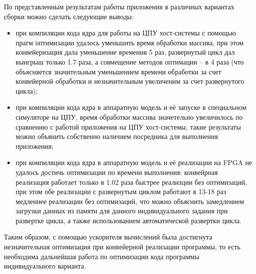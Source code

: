 По представленным результатам работы приложения в различных вариантах сборки
можно сделать следующие выводы:
\begin{itemize}
    \item при компиляции кода ядра для работы на ЦПУ хост-системы с помощью
          прагм оптимизации удалось уменьшить время обработки массива, при этом
          конвейеризация дала уменьшение временив 5 раз, развернутый цикл дал
          выигрыш только 1.7 раза, а совмещение методов оптимации -- в 4 раза
          (что объясняется значительным уменьшением времени обработки за счет
          конвейерной обработки и незначительным увеличеним за счет
          развернутого цикла);
    \item при компиляции кода ядра в аппаратную модель и её запуске в
          специальном симуляторе на ЦПУ, время обработки массива значетельно
          увеличилось по сравнению с работой приложения на ЦПУ хост-системы,
          такие результаты можно объянить собственно наличием посредника для
          выполнения приложения;
    \item при компиляции кода ядра в аппаратную модель и её реализации на FPGA
          не удалось достичь оптимизации по времени выполнения: конвейрная
          реализация работает только в 1.02 раза быстрее реализции без
          оптимизаций, при этом обе реализации с развернутым циклом работают в
          13-18 раз медленнее реализации без оптимизаций, что можно объяснить
          замедлением загрузки данных из памяти для данного индивидуального
          задания при развертке цикла, а также использованием автоматической
          развертки цикла.
\end{itemize}

Таким образом, с помощью ускорителя вычислений была достигнута незначительная оптимизация при конвейерной реализации программы, то есть необходима дальнейшая работа по оптимизации кода программы индивидуального варианта.
